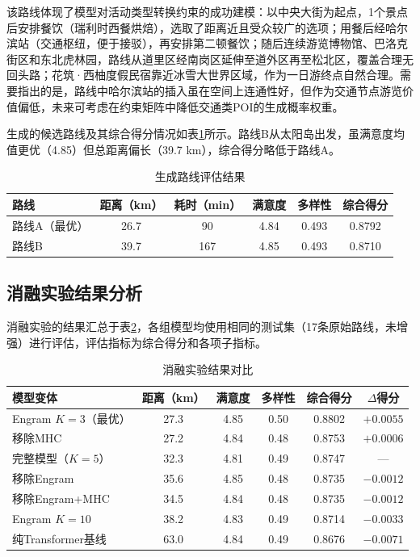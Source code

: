 \documentclass[12pt,a4paper]{ctexart}
\newenvironment{tighttable}
  {\setstretch{1.0}\small}
  {}
\begin{document}
该路线体现了模型对活动类型转换约束的成功建模：以中央大街为起点，1个景点后安排餐饮（瑞利时西餐烘焙），选取了距离近且受众较广的选项；用餐后经哈尔滨站（交通枢纽，便于接驳），再安排第二顿餐饮；随后连续游览博物馆、巴洛克街区和东北虎林园，路线从道里区经南岗区延伸至道外区再至松北区，覆盖合理无回头路；花筑·西柚度假民宿靠近冰雪大世界区域，作为一日游终点自然合理。需要指出的是，路线中哈尔滨站的插入虽在空间上连通性好，但作为交通节点游览价值偏低，未来可考虑在约束矩阵中降低交通类POI的生成概率权重。

生成的候选路线及其综合得分情况如表\ref{tab:routes}所示。路线B从太阳岛出发，虽满意度均值更优（4.85）但总距离偏长（39.7 km），综合得分略低于路线A。

\begin{table}[H]
\centering
\caption{生成路线评估结果}
\label{tab:routes}
\begin{tighttable}
\begin{tabular}{lccccc}
\toprule
路线 & 距离（km） & 耗时（min） & 满意度 & 多样性 & 综合得分 \\
\midrule
路线A（最优） & 26.7 & 90 & 4.84 & 0.493 & 0.8792 \\
路线B & 39.7 & 167 & 4.85 & 0.493 & 0.8710 \\
\bottomrule
\end{tabular}
\end{tighttable}
\end{table}

\subsection{消融实验结果分析}

消融实验的结果汇总于表\ref{tab:ablation_results}，各组模型均使用相同的测试集（17条原始路线，未增强）进行评估，评估指标为综合得分和各项子指标。

\begin{table}[H]
\centering
\caption{消融实验结果对比}
\label{tab:ablation_results}
\begin{tighttable}
\begin{tabular}{lccccc}
\toprule
模型变体 & 距离（km） & 满意度 & 多样性 & 综合得分 & $\Delta$得分 \\
\midrule
Engram $K=3$（最优） & 27.3 & 4.85 & 0.50 & 0.8802 & $+0.0055$ \\
移除MHC & 27.2 & 4.84 & 0.48 & 0.8753 & $+0.0006$ \\
完整模型（$K=5$） & 32.3 & 4.81 & 0.49 & 0.8747 & — \\
移除Engram & 35.6 & 4.85 & 0.48 & 0.8735 & $-0.0012$ \\
移除Engram+MHC & 34.5 & 4.84 & 0.48 & 0.8735 & $-0.0012$ \\
Engram $K=10$ & 38.2 & 4.83 & 0.49 & 0.8714 & $-0.0033$ \\
纯Transformer基线 & 63.0 & 4.84 & 0.49 & 0.8676 & $-0.0071$ \\
\bottomrule
\end{tabular}
\end{tighttable}
\end{table}
\end{document}

